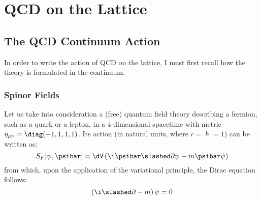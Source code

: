 \pagestyle{myFancy}
\chapter{QCD on the Lattice}
\section{The QCD Continuum Action}
In order to write the action of QCD on the lattice, I must first recall how the theory is formulated in the continuum.

\subsection{Spinor Fields}
Let us take into consideration a (free) quantum field theory describing a fermion, such as a quark or a lepton, in a $4$-dimensional spacetime with metric $\eta_{\mu\nu} = \diag(-1,1,1,1)$. Its action (in natural units, where $c = \hslash = 1$) can be written as:
\begin{equation}
      S_F[\psi,\psibar] = \dV \left( \i\psibar\slashed\partial\psi - m\psibar\psi \right) \label{1:FreeFermionAction}
\end{equation}
from which, upon the application of the variational principle, the Dirac equation follows:
\begin{equation}
    \left( \i\slashed\partial-m \right) \psi = 0 \label{1:DiracEq}
\end{equation}

